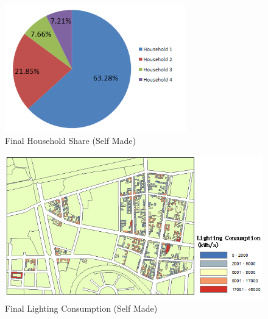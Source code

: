 \begin{figure}[ht]
	\centering
	\includegraphics[width=0.7\textwidth]{phase2/group3/fig15.png}
	\caption{Final Household Share (Self Made)}
	\label{fig:figure15}
\end{figure}

\begin{figure}[ht]
	\centering
	\includegraphics[width=1\textwidth]{phase2/group3/fig16.png}
	\caption{Final Lighting Consumption (Self Made)}
	\label{fig:figure16}
\end{figure}

